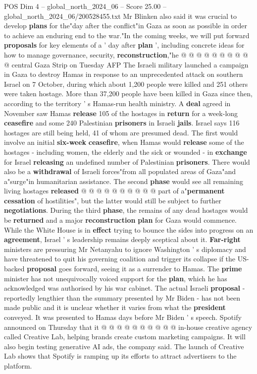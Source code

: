 \begin{textsample}{POS Dim 4 – global\_north\_2024\_06 – Score 25.00 – global\_north\_2024\_06/200528455.txt}
Mr Blinken also said it was crucial to develop \textbf{plans} for the"day after the conflict"in Gaza as soon as possible in order to achieve an enduring end to the war."In the coming weeks, we will put forward \textbf{proposals} for key elements of a ' day after \textbf{plan} ', including concrete ideas for how to manage governance, security, \textbf{reconstruction},"he @ @ @ @ @ @ @ @ @ @ central Gaza Strip on Tuesday AFP The Israeli military launched a campaign in Gaza to destroy Hamas in response to an unprecedented attack on southern Israel on 7 October, during which about 1,200 people were killed and 251 others were taken hostage.
More than 37,200 people have been killed in Gaza since then, according to the territory ' s Hamas-run health ministry.
A \textbf{deal} agreed in November saw Hamas \textbf{release} 105 of the hostages in \textbf{return} for a week-long \textbf{ceasefire} and some 240 Palestinian \textbf{prisoners} in Israeli \textbf{jails}.
Israel says 116 hostages are still being held, 41 of whom are presumed dead.
The first would involve an initial \textbf{six-week} \textbf{ceasefire}, when Hamas would \textbf{release} some of the hostages - including women, the elderly and the sick or wounded - in \textbf{exchange} for Israel \textbf{releasing} an undefined number of Palestinian \textbf{prisoners}.
There would also be a \textbf{withdrawal} of Israeli forces"from all populated areas of Gaza"and a"surge"in humanitarian assistance.
The second \textbf{phase} would see all remaining living hostages \textbf{released} @ @ @ @ @ @ @ @ @ @ part of a"\textbf{permanent} \textbf{cessation} of hostilities", but the latter would still be subject to further \textbf{negotiations}.
During the third \textbf{phase}, the remains of any dead hostages would be \textbf{returned} and a major \textbf{reconstruction} \textbf{plan} for Gaza would commence.
While the White House is in \textbf{effect} trying to bounce the sides into progress on an \textbf{agreement}, Israel ' s leadership remains deeply sceptical about it. \textbf{Far-right} ministers are pressuring Mr Netanyahu to ignore Washington ' s diplomacy and have threatened to quit his governing coalition and trigger its collapse if the US-backed \textbf{proposal} goes forward, seeing it as a surrender to Hamas.
The \textbf{prime} minister has not unequivocally voiced support for the \textbf{plan}, which he has acknowledged was authorised by his war cabinet.
The actual Israeli \textbf{proposal} - reportedly lengthier than the summary presented by Mr Biden - has not been made public and it is unclear whether it varies from what the \textbf{president} conveyed.
It was presented to Hamas days before Mr Biden ' s speech.
Spotify announced on Thursday that it @ @ @ @ @ @ @ @ @ @ in-house creative agency called Creative Lab, helping brands create custom marketing campaigns.
It will also begin testing generative AI ads, the company said.
The launch of Creative Lab shows that Spotify is ramping up its efforts to attract advertisers to the platform.


\end{textsample}
